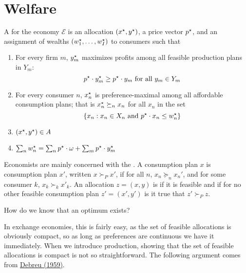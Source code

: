 \documentclass[10pt]{article}
\begin{document}
\section{Welfare}

\begin{definition}
	A  for the economy $\mathcal{E}$ is an allocation $(x^\star,y^\star)$, a price vector $p^\star$, and an assignment of wealths $(w_1^\star,\dots,w_I^\star)$ to consumers such that
	\begin{enumerate}
		\item For every firm $m$, $y_m^\star$ maximizes profits among all feasible production plans in $Y_m$:\[p^\star \cdot y^\star_m \ge p^\star \cdot y_m \text{ for all } y_m \in Y_m\]
		\item For every consumer $n$, $x_n^\star$ is preference-maximal among all affordable consumption plans; that is $x_n^\star \succeq_n x_n$ for all $x_n$ in the set \[\{x_n : x_n \in X_n \text{ and } p^\star \cdot x_n \le w_n^\star\}\]
		\item $(x^\star,y^\star) \in A$
		\item $\sum_n w_n^\star = \sum_n p^\star \cdot \omega + \sum_m p^\star \cdot y^\star_m$
	\end{enumerate}
\end{definition}

\begin{definition}
	Economists are mainly concerned with the . A consumption plan $x$ is  consumption plan $x'$, written $x \succ_P x'$, if for all $n$, $x_n \succeq_n x_n'$, and for some consumer $k$, $x_k \succ_k x'_k$. An allocation $z = (x,y)$ is  if it is feasible and if for no other feasible consumption plan $z' = (x',y')$ is it true that $z' \succ_P z$.
\end{definition}
\begin{remark}
	How do we know that an optimum exists? 
\end{remark}
In exchange economies, this is fairly easy, as the set of feasible allocations is obviously compact, so as long as preferences are continuous we have it immediately. When we introduce production, showing that the set of feasible allocations is compact is not so straightforward. The following argument comes from \href{http://digamo.free.fr/debreu59.pdf}{Debreu (1959)}.
\end{document}
